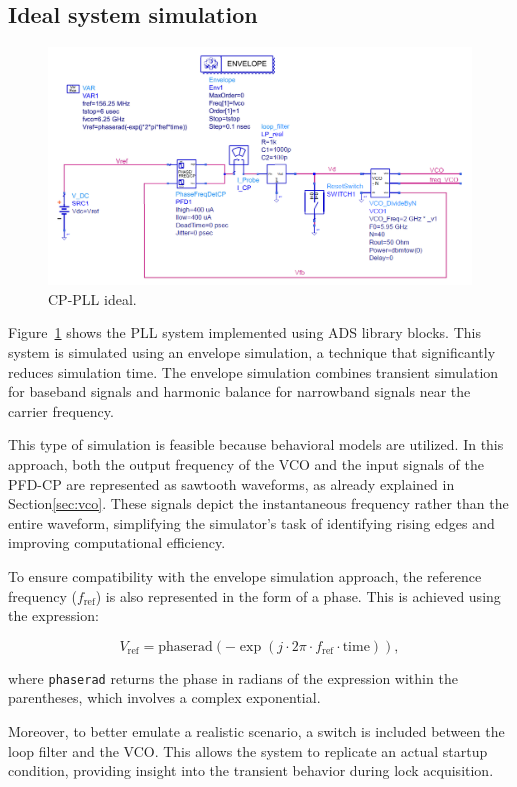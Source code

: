 \documentclass[lettersize,journal]{IEEEtran}
\begin{document}
\subsection{Ideal system simulation}

\begin{figure}[!ht]
    \centering
    \includegraphics[width=0.7\linewidth]{images/intro_system_level/pll_ideal.png}
    \caption{CP-PLL ideal.}
    \label{fig:PLL_ideal}
\end{figure}

Figure~\ref{fig:PLL_ideal} shows the PLL system implemented using ADS library blocks. This system is simulated using an envelope simulation, a technique that significantly reduces simulation time. The envelope simulation combines transient simulation for baseband signals and harmonic balance for narrowband signals near the carrier frequency. 

This type of simulation is feasible because behavioral models are utilized. In this approach, both the output frequency of the VCO and the input signals of the PFD-CP are represented as sawtooth waveforms, as already explained in Section\ref{sec:vco}. These signals depict the instantaneous frequency rather than the entire waveform, simplifying the simulator's task of identifying rising edges and improving computational efficiency.

To ensure compatibility with the envelope simulation approach, the reference frequency (\(f_{\text{ref}}\)) is also represented in the form of a phase. This is achieved using the expression:

\[
V_{\text{ref}} = \text{phaserad}\left(-\exp(j \cdot 2\pi \cdot f_{\text{ref}} \cdot \text{time})\right),
\]

where \texttt{phaserad} returns the phase in radians of the expression within the parentheses, which involves a complex exponential. 

Moreover, to better emulate a realistic scenario, a switch is included between the loop filter and the VCO. This allows the system to replicate an actual startup condition, providing insight into the transient behavior during lock acquisition.
\end{document}
